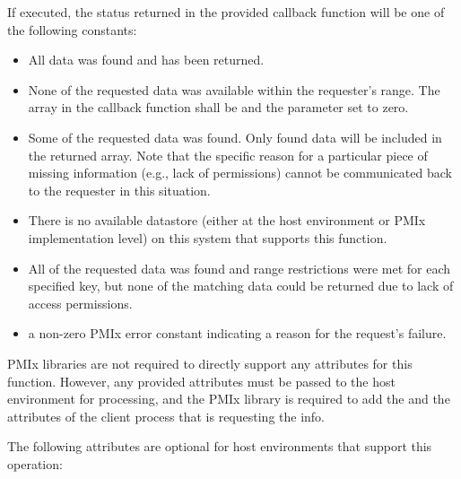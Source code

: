 If executed, the status returned in the provided callback function will be one of the following constants:

\begin{itemize}
\item {} All data was found and has been returned.

\item {} None of the requested data was available within the requester's range. The  array in the callback function shall be  and the  parameter set to zero.

\item {} Some of the requested data was found.
Only found data will be included in the returned  array. Note that the specific reason for a particular piece of missing information (e.g., lack of permissions) cannot be communicated back to the requester in this situation.

\item {} There is no available datastore (either at the host environment or \ac{PMIx} implementation level) on this system that supports this function.

\item {} All of the requested data was found and range restrictions were met for each specified key, but none of the matching data could be returned due to lack of access permissions.

\item a non-zero \ac{PMIx} error constant indicating a reason for the request's failure.
\end{itemize}

\reqattrstart
\ac{PMIx} libraries are not required to directly support any attributes for this function. However, any provided attributes must be passed to the host environment for processing, and the \ac{PMIx} library is required to add the  and the  attributes of the client process that is requesting the info.

\reqattrend

\optattrstart
The following attributes are optional for host environments that support this operation:


\optattrend

